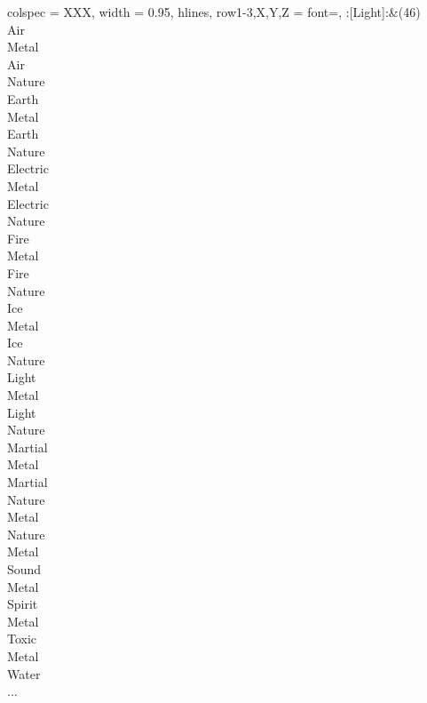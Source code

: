 \begin{longtblr}[
	caption = {2v1 Defending Resisted},
	label = {2v1-Defending-Resisted},
]{
	colspec = {XXX}, width = 0.95\linewidth,
	hlines,
	row{1-3,X,Y,Z} = {font=\bfseries},
}
	:[Light]:&{(46)\\
	Air \\
	Metal \\
	Air \\
	Nature \\
	Earth \\
	Metal \\
	Earth \\
	Nature \\
	Electric \\
	Metal \\
	Electric \\
	Nature \\
	Fire \\
	Metal \\
	Fire \\
	Nature \\
	Ice \\
	Metal \\
	Ice \\
	Nature \\
	Light \\
	Metal \\
	Light \\
	Nature \\
	Martial \\
	Metal \\
	Martial \\
	Nature \\
	Metal \\
	Nature \\
	Metal \\
	Sound \\
	Metal \\
	Spirit \\
	Metal \\
	Toxic \\
	Metal \\
	Water \\
	...\\
	}\\


\end{longtblr}
